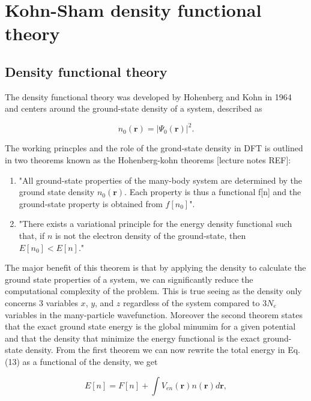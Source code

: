 \section{Kohn-Sham density functional theory}

\subsection{Density functional theory}

The density functional theory was developed by Hohenberg and Kohn in 1964 and centers around the ground-state density of a system, described as

\begin{equation}
    n_0(\boldsymbol{r}) = |\Psi_0(\boldsymbol{r})|^2.  
\end{equation}

The working princples and the role of the grond-state density in DFT is outlined in two theorems known as the Hohenberg-kohn theorems [lecture notes REF]:

\begin{enumerate}
\item "All ground-state properties of the many-body system are determined by the ground state density $n_0(\boldsymbol{r})$. Each property is thus a functional f[n] and the ground-state property is obtained from $f[n_0]$". 
\item "There exists a variational principle for the energy density functional such that, if $n$ is not the electron density of the ground-state, then $E[n_0] < E[n]$."
\end{enumerate}

The major benefit of this theorem is that by applying the density to calculate the ground state properties of a system, we can significantly reduce the computational complexity of the problem. This is true seeing as the density only concerns 3 variables $x$, $y$, and $z$ regardless of the system compared to $3N_e$ variables in the many-particle wavefunction. Moreover the second theorem states that the exact ground state energy is the global minumim for a given potential and that the density that minimize the energy functional is the exact ground-state density. From the first theorem we can now rewrite the total energy in Eq. (13) as a functional of the density, we get

\begin{equation}
    E[n] = F[n] + \int V_{en}(\boldsymbol{r})n(\boldsymbol{r})d\boldsymbol{r},
\end{equation}


